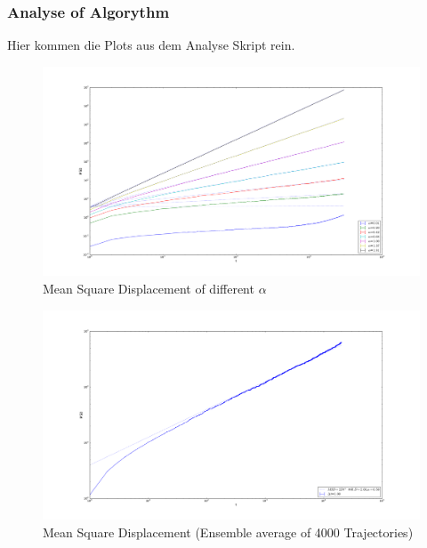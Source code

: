 \documentclass[
  a4paper,BCOR10mm,oneside,
  bibtotoc,idxtotoc,
  headsepline,footsepline,%
  fleqn,openbib
]{scrbook}
\begin{document}
\subsubsection{Analyse of Algorythm}
Hier kommen die Plots  aus dem Analyse Skript rein.

\begin{figure}[h]
\includegraphics[width=\textwidth]{./msd_ensemble_alpha.pdf}
\caption{Mean Square Displacement of different $\alpha$}
 \centering
\end{figure}


\begin{figure}[h]
\includegraphics[width=\textwidth]{./msd_ensemble_4000particles_log.pdf}
\caption{Mean Square Displacement (Ensemble average of 4000 Trajectories)}
 \centering
\end{figure}
\end{document}
